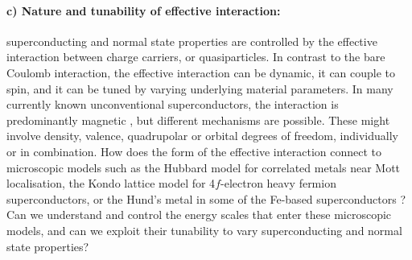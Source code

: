 \paragraph{c) Nature and tunability of effective interaction:} superconducting and normal state properties are controlled by the effective interaction between charge carriers, or quasiparticles. In contrast to the bare Coulomb interaction, the effective interaction can be dynamic, it can couple to spin, and it can be tuned by varying underlying material parameters. In many currently known unconventional superconductors, the interaction is predominantly magnetic \cite{monthoux07}, but different mechanisms are possible. These might involve density, valence, quadrupolar or orbital degrees of freedom, individually or in combination. How does the form of the effective interaction connect to microscopic models such as the Hubbard model for correlated metals near Mott localisation, the Kondo lattice model for 4$f$-electron heavy fermion superconductors, or the Hund's metal in some of the Fe-based superconductors \cite{georges13}? 
Can we understand and control the energy scales that enter these microscopic models,  and can we exploit their tunability to vary superconducting and normal state properties? 

